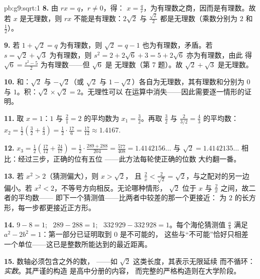 \begin{solution}{pb:g9:sqrt:1}
\textbf{8.} 由 $r x = q$，$r \neq 0$，得：
$x = \frac qr$，为有理数之商，因而是有理数。故若
$x$ 是无理数，则 $r x$ 不能是有理数：$2\sqrt2$ 与
$\frac{\sqrt2}{2}$ 都是无理数（乘数分别为 $2$ 和
$\frac12$）。

\textbf{9.} 若 $1 + \sqrt2 = q$ 为有理数，则
$\sqrt2 = q - 1$ 也为有理数，矛盾。若
$s = \sqrt2 + \sqrt3$ 为有理数，则
$s^2 = 2 + 2\sqrt6 + 3 = 5 + 2\sqrt6$ 亦为有理数，由此
得 $\sqrt6 = \frac{s^2 - 5}{2}$ 为有理数——但 $\sqrt6$ 是
无理数（第 7 题）。故 $\sqrt2 + \sqrt3$ 是无理数。

\textbf{10.} 和：$\sqrt2$ 与 $-\sqrt2$（或 $\sqrt2$ 与
$1 - \sqrt2$）各自为无理数，其有理数和分别为 $0$ 与
$1$。积：$\sqrt2 \times \sqrt2 = 2$。无理性可以
在运算中消失——因此需要逐一情形的证明。

\textbf{11.} 取 $x = 1$：$1$ 与 $\frac21 = 2$ 的平均数为
$x_1 = \frac32$。再取 $\frac32$ 与
$\frac{2}{3/2} = \frac43$ 的平均数：
$x_2 = \frac12\left(\frac32 + \frac43\right)
= \frac12 \cdot \frac{17}{6} = \frac{17}{12} \approx 1.4167$.

\textbf{12.} $x_3 = \frac12\left(\frac{17}{12} +
\frac{24}{17}\right) = \frac12 \cdot
\frac{289 + 288}{204} = \frac{577}{408} = 1.4142156\ldots$
与 $\sqrt2 = 1.4142135\ldots$ 相比：经过三步，正确的位有五位
——此方法每轮使正确的位数
大约翻一番。

\textbf{13.} 若 $x^2 > 2$（猜测偏大），则 $x > \sqrt2$，
且 $\frac2x < \frac{2}{\sqrt2} = \sqrt2$，与之配对的另一边
偏小。若 $x^2 < 2$，不等号方向相反。无论哪种情形，
$\sqrt2$ 位于 $x$ 与 $\frac2x$ 之间，故二者的平均数——
即下一个猜测值——比两者中较差的那一个更接近：
为 $2$ 的长方形，每一步都更接近正方形。

\textbf{14.} $9 - 8 = 1$; \ $289 - 288 = 1$; \
$332\,929 - 332\,928 = 1$。每个海伦猜测值 $\frac ab$
满足 $a^2 - 2b^2 = 1$：第一部分已证明取到 $0$ 是不可能的，
这些与“不可能”恰好只相差
一个单位——这已是整数所能达到的最近距离。

\textbf{15.} 数轴必须包含之外的数，
——如 $\sqrt2$ 这类长度，其表示无限延续
而不循环：\emph{实数}。其严谨的构造
是高中分册的内容，
而完整的严格构造则在大学阶段。
\end{solution}
